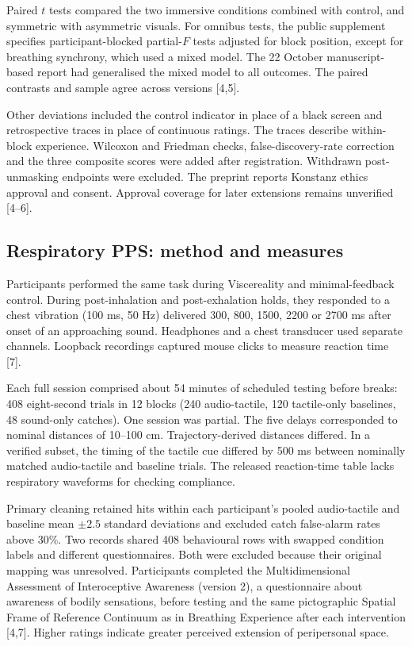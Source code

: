 Paired $t$ tests compared the two immersive conditions combined with control, and symmetric with asymmetric visuals. For omnibus tests, the public supplement specifies participant-blocked partial-$F$ tests adjusted for block position, except for breathing synchrony, which used a mixed model. The 22 October manuscript-based report had generalised the mixed model to all outcomes. The paired contrasts and sample agree across versions [4,5].

Other deviations included the control indicator in place of a black screen and retrospective traces in place of continuous ratings. The traces describe within-block experience. Wilcoxon and Friedman checks, false-discovery-rate correction and the three composite scores were added after registration. Withdrawn post-unmasking endpoints were excluded. The preprint reports Konstanz ethics approval and consent. Approval coverage for later extensions remains unverified [4--6].

\subsection{Respiratory PPS: method and measures}
\label{sec:pps-methods}
Participants performed the same task during Viscereality and minimal-feedback control. During post-inhalation and post-exhalation holds, they responded to a chest vibration (100 ms, 50 Hz) delivered 300, 800, 1500, 2200 or 2700 ms after onset of an approaching sound. Headphones and a chest transducer used separate channels. Loopback recordings captured mouse clicks to measure reaction time [7].

Each full session comprised about 54 minutes of scheduled testing before breaks: 408 eight-second trials in 12 blocks (240 audio-tactile, 120 tactile-only baselines, 48 sound-only catches). One session was partial. The five delays corresponded to nominal distances of 10--100 cm. Trajectory-derived distances differed. In a verified subset, the timing of the tactile cue differed by 500 ms between nominally matched audio-tactile and baseline trials. The released reaction-time table lacks respiratory waveforms for checking compliance.

Primary cleaning retained hits within each participant's pooled audio-tactile and baseline mean $\pm2.5$ standard deviations and excluded catch false-alarm rates above 30\%. Two records shared 408 behavioural rows with swapped condition labels and different questionnaires. Both were excluded because their original mapping was unresolved. Participants completed the Multidimensional Assessment of Interoceptive Awareness (version 2), a questionnaire about awareness of bodily sensations, before testing and the same pictographic Spatial Frame of Reference Continuum as in Breathing Experience after each intervention [4,7]. Higher ratings indicate greater perceived extension of peripersonal space.

